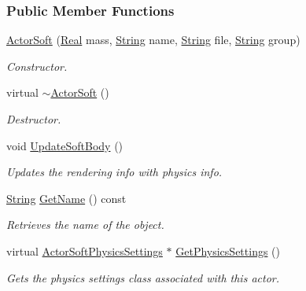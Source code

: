 \subsubsection*{Public Member Functions}
\begin{DoxyCompactItemize}
\item 
\hyperlink{classphys_1_1ActorSoft_af766f6898fb80de4ab98012372a5e6f8}{ActorSoft} (\hyperlink{namespacephys_af7eb897198d265b8e868f45240230d5f}{Real} mass, \hyperlink{namespacephys_aa03900411993de7fbfec4789bc1d392e}{String} name, \hyperlink{namespacephys_aa03900411993de7fbfec4789bc1d392e}{String} file, \hyperlink{namespacephys_aa03900411993de7fbfec4789bc1d392e}{String} group)
\begin{DoxyCompactList}\small\item\em Constructor. \item\end{DoxyCompactList}\item 
virtual \hyperlink{classphys_1_1ActorSoft_a636c145f1e468fd45adc8da2a1708fbe}{$\sim$ActorSoft} ()
\begin{DoxyCompactList}\small\item\em Destructor. \item\end{DoxyCompactList}\item 
void \hyperlink{classphys_1_1ActorSoft_a330e7bacd6250a2a24479561a84ea073}{UpdateSoftBody} ()
\begin{DoxyCompactList}\small\item\em Updates the rendering info with physics info. \item\end{DoxyCompactList}\item 
\hyperlink{namespacephys_aa03900411993de7fbfec4789bc1d392e}{String} \hyperlink{classphys_1_1ActorSoft_a2b6bc680d900626275dc5eb3b631acca}{GetName} () const 
\begin{DoxyCompactList}\small\item\em Retrieves the name of the object. \item\end{DoxyCompactList}\item 
virtual \hyperlink{classphys_1_1ActorSoftPhysicsSettings}{ActorSoftPhysicsSettings} $\ast$ \hyperlink{classphys_1_1ActorSoft_a838160fd7c27302cc47291324eb62632}{GetPhysicsSettings} ()
\begin{DoxyCompactList}\small\item\em Gets the physics settings class associated with this actor. \item\end{DoxyCompactList}\item 

\end{DoxyCompactItemize}
